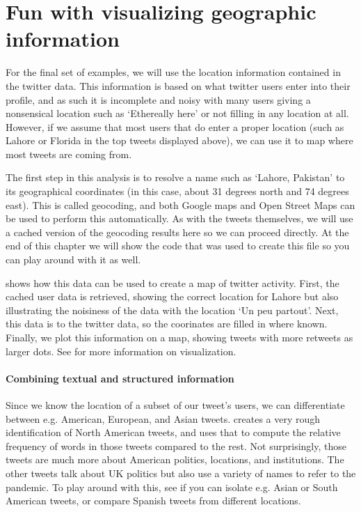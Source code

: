 
\section{Fun with visualizing geographic information}
For the final set of examples, we will use the location information contained in the twitter data.
This information is based on what twitter users enter into their profile, and as such it is incomplete and noisy
with many users giving a nonsensical location such as `Ethereally here' or not filling in any location at all.
However, if we assume that most users that do enter a proper location (such as Lahore or Florida in the top tweets displayed above),
we can use it to map where most tweets are coming from.

The first step in this analysis is to resolve a name such as `Lahore, Pakistan' to its geographical coordinates (in this case, about 31 degrees north and 74 degrees east). This is called geocoding, and both Google maps and Open Street Maps can be used
to perform this automatically.
As with the tweets themselves, we will use a cached version of the geocoding results here so we can proceed directly.
At the end of this chapter we will show the code that was used to create this file so you can play around with it as well. 

 shows how this data can be used to create a map of twitter activity.
First, the cached user data is retrieved, showing the correct location for Lahore but also
illustrating the noisiness of the data with the location `Un peu partout'.
Next, this data is  to the twitter data, so the coorinates are filled in where known.
Finally, we plot this information on a map, showing tweets with more retweets as larger dots.
See  for more information on visualization.



\paragraph{Combining textual and structured information}
Since we know the location of a subset of our tweet's users,
we can differentiate between e.g. American, European, and Asian tweets.
 creates a very rough identification of North American tweets,
and uses that to compute the relative frequency of words in those tweets compared to the rest.
Not surprisingly, those tweets are much more about American politics, locations, and institutions.
The other tweets talk about UK politics but also use a variety of names to refer to the pandemic.
To play around with this, see if you can isolate e.g. Asian or South American tweets,
or compare Spanish tweets from different locations.

